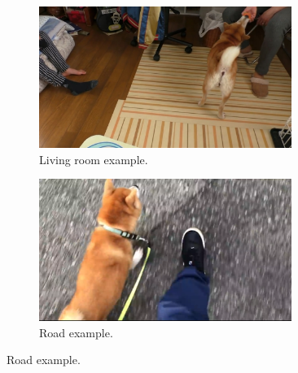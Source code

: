 \documentclass[letterpaper]{article}
\begin{document}
\begin{figure}[h]
\begin{subfigure}[]{0.4\textwidth}
	\centering
	\includegraphics[width=0.9\textwidth]{images/livingroom.jpg}
	\caption{Living room example.}
\label{fig:loc7}
\end{subfigure}
\begin{subfigure}[]{0.4\textwidth}
	\centering
	\includegraphics[width=0.9\textwidth]{images/road.png}
	\caption{Road example.}
	\label{fig:loc8}
\end{subfigure}


\end{figure}
\end{document}
